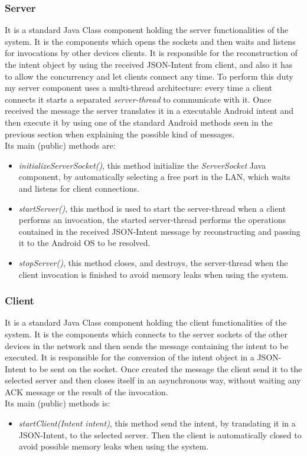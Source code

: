 \subsubsection{Server}
It is a standard Java Class component holding the server functionalities of the system. It is the components which opens the sockets and then waits and listens for invocations by other devices clients. It is responsible for the reconstruction of the intent object by using the received JSON-Intent from client, and also it has to allow the concurrency and let clients connect any time.
To perform this duty my server component uses a multi-thread architecture: every time a client connects it starts a separated \textit{server-thread} to communicate with it. Once received the message the server translates it in a executable Android intent and then execute it by using one of the standard Android methods seen in the previous section when explaining the possible kind of messages.\\
Its main (public) methods are:
\begin{itemize}
	\item \textit{initializeServerSocket()}, this method initialize the \textit{ServerSocket} Java component, by automatically selecting a free port in the LAN, which waits and listens for client connections.
	\item \textit{startServer()}, this method is used to start the server-thread when a client performs an invocation, the started server-thread performs the operations contained in the received JSON-Intent message by reconstructing and passing it to the Android OS to be resolved.
	\item \textit{stopServer()}, this method closes, and destroys, the server-thread when the client invocation is finished to avoid memory leaks when using the system. 
\end{itemize}

\subsubsection{Client}
It is a standard Java Class component holding the client functionalities of the system. It is the components which connects to the  server sockets of the other devices in the network and then sends the message containing the intent to be executed. It is responsible for the conversion of the intent object in a JSON-Intent to be sent on the socket. Once created the message the client send it to the selected server and then closes itself in an asynchronous way, without waiting any ACK message or the result of the invocation.\\
Its main (public) methods is:
\begin{itemize}
	\item \textit{startClient(Intent intent)}, this method send the intent, by translating it in a JSON-Intent, to the selected server. Then the client is automatically closed to avoid possible memory leaks when using the system. 
\end{itemize}
